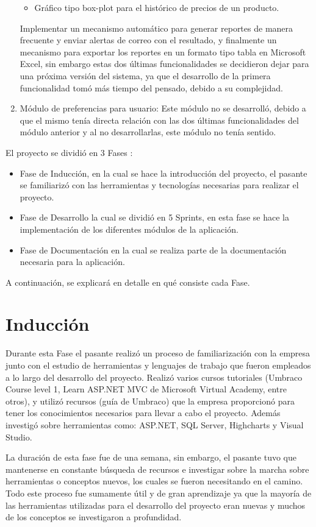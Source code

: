 \begin{enumerate}
\begin{itemize}
        \item Gráfico tipo box-plot para el histórico de precios de un producto.
	\end{itemize}
	Implementar un mecanismo automático para generar reportes de manera frecuente y enviar alertas de correo con el resultado, y finalmente un mecanismo para exportar los reportes en un formato tipo tabla en Microsoft Excel, sin embargo estas dos últimas funcionalidades se decidieron dejar para una próxima versión del sistema, ya que el desarrollo de la primera funcionalidad tomó más tiempo del pensado, debido a su complejidad.
	\item Módulo de preferencias para usuario: Este módulo no se desarrolló, debido a que el mismo tenía directa relación con las dos últimas funcionalidades del módulo anterior y al no desarrollarlas, este módulo no tenía sentido. 
\end{enumerate}
    El proyecto se dividió en 3 Fases :
\begin{itemize}
   \item Fase de Inducción, en la cual se hace la introducción del proyecto, el pasante se familiarizó con las herramientas y tecnologías necesarias para realizar el proyecto.
   \item Fase de Desarrollo la cual se dividió en 5 Sprints, en esta fase se hace la implementación de los diferentes módulos de la aplicación.
   \item Fase de Documentación en la cual se realiza parte de la documentación necesaria para la aplicación.
\end{itemize}
A continuación, se explicará en detalle en qué consiste cada Fase.

\section{Inducción}
Durante esta Fase el pasante realizó un proceso de familiarización con la empresa junto con el estudio de herramientas y lenguajes de trabajo que fueron empleados a lo largo del desarrollo del proyecto.
Realizó varios cursos tutoriales (Umbraco Course level 1, Learn ASP.NET MVC de Microsoft Virtual Academy, entre otros),  y utilizó recursos (guía de Umbraco) que la empresa proporcionó para tener los conocimientos necesarios para llevar a cabo el proyecto. Además investigó sobre herramientas como: ASP.NET, SQL Server, Highcharts y Visual Studio.

La duración de esta fase fue de una semana, sin embargo, el pasante tuvo que mantenerse en constante búsqueda de recursos e investigar sobre la marcha sobre herramientas o conceptos nuevos, los cuales se fueron necesitando en el camino. Todo este proceso fue sumamente útil y de gran aprendizaje ya que la mayoría de las herramientas utilizadas para el desarrollo del proyecto eran nuevas y muchos de los conceptos se investigaron a profundidad.

